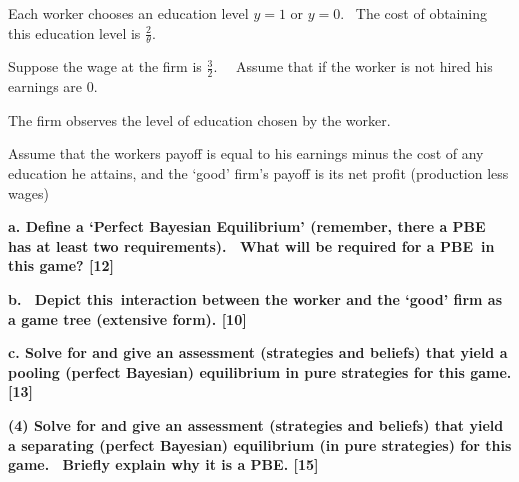 \documentclass{article}
\begin{document}
Each worker chooses an education level $y=1$ or $y=0$. \ The cost of
obtaining this education level is $\frac{2}{\theta }$.

Suppose the wage at the firm is $\frac{3}{2}$. \ \ Assume that if the worker
is not hired his earnings are $0$.

The firm observes the level of education chosen by the worker.

Assume that the workers payoff is equal to his earnings minus the cost of
any education he attains, and the `good' firm's payoff is its net profit
(production less wages)

\bigskip

\textbf{a. Define a `Perfect Bayesian Equilibrium' (remember, there a PBE
has at least two requirements). \ What will be required for a PBE\ in this
game? [12]}

\bigskip

\textbf{b. \ Depict this\ interaction between the worker and the `good' firm
as a game tree (extensive form). [10]}

\textbf{c. Solve for and give an assessment (strategies and beliefs) that
yield a pooling (perfect Bayesian) equilibrium in pure strategies for this
game. [13]}

\bigskip

\textbf{(4) Solve for and give an assessment (strategies and beliefs) that
yield a separating (perfect Bayesian) equilibrium (in pure strategies) for
this game. \ Briefly explain why it is a PBE. [15]}

\bigskip
\end{document}

